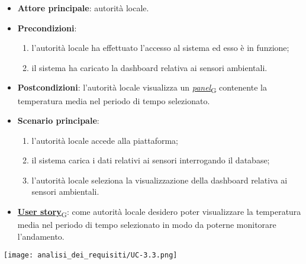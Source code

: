 \begin{itemize}
	\item \textbf{Attore principale}: autorità locale.
	\item \textbf{Precondizioni}:
	      \begin{enumerate}
		      \item l'autorità locale ha effettuato l'accesso al sistema ed esso è in funzione;
		      \item il sistema ha caricato la dashboard relativa ai sensori ambientali.
	      \end{enumerate}
	\item \textbf{Postcondizioni}: l'autorità locale visualizza un \href{https://7last.github.io/docs/pb/documentazione-interna/glossario\#panel}{\textit{panel}\textsubscript{G}} contenente la temperatura media nel periodo di tempo selezionato.
	\item \textbf{Scenario principale}:
	      \begin{enumerate}
		      \item l'autorità locale accede alla piattaforma;
		      \item il sistema carica i dati relativi ai sensori interrogando il database;
		      \item l'autorità locale seleziona la visualizzazione della dashboard relativa ai sensori ambientali.
	      \end{enumerate}
	\item \href{https://7last.github.io/docs/pb/documentazione-interna/glossario\#user-story}{\textbf{User story}\textsubscript{G}}: come autorità locale desidero poter visualizzare la temperatura media nel periodo di tempo selezionato
	      in modo da poterne monitorare l'andamento.
\end{itemize}
\begin{center}
	\texttt{[image: analisi\_dei\_requisiti/UC-3.3.png]}
\end{center}


